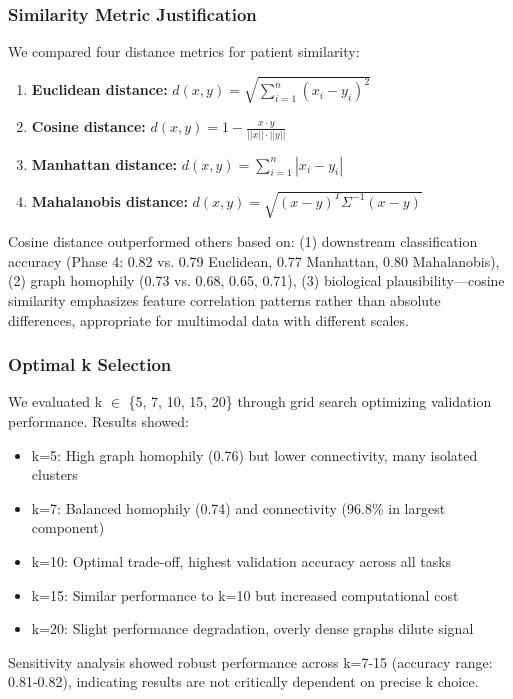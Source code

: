 \documentclass[11pt]{article}
\begin{document}
\subsubsection{Similarity Metric Justification}
We compared four distance metrics for patient similarity:
\begin{enumerate}
    \item \textbf{Euclidean distance:} $d(x,y) = \sqrt{\sum_{i=1}^n (x_i - y_i)^2}$
    \item \textbf{Cosine distance:} $d(x,y) = 1 - \frac{x \cdot y}{||x|| \cdot ||y||}$
    \item \textbf{Manhattan distance:} $d(x,y) = \sum_{i=1}^n |x_i - y_i|$
    \item \textbf{Mahalanobis distance:} $d(x,y) = \sqrt{(x-y)^T \Sigma^{-1} (x-y)}$
\end{enumerate}

Cosine distance outperformed others based on: (1) downstream classification accuracy (Phase 4: 0.82 vs. 0.79 Euclidean, 0.77 Manhattan, 0.80 Mahalanobis), (2) graph homophily (0.73 vs. 0.68, 0.65, 0.71), (3) biological plausibility—cosine similarity emphasizes feature correlation patterns rather than absolute differences, appropriate for multimodal data with different scales.

\subsubsection{Optimal k Selection}
We evaluated k $\in$ \{5, 7, 10, 15, 20\} through grid search optimizing validation performance. Results showed:
\begin{itemize}
    \item k=5: High graph homophily (0.76) but lower connectivity, many isolated clusters
    \item k=7: Balanced homophily (0.74) and connectivity (96.8\% in largest component)
    \item k=10: Optimal trade-off, highest validation accuracy across all tasks
    \item k=15: Similar performance to k=10 but increased computational cost
    \item k=20: Slight performance degradation, overly dense graphs dilute signal
\end{itemize}

Sensitivity analysis showed robust performance across k=7-15 (accuracy range: 0.81-0.82), indicating results are not critically dependent on precise k choice.
\end{document}
